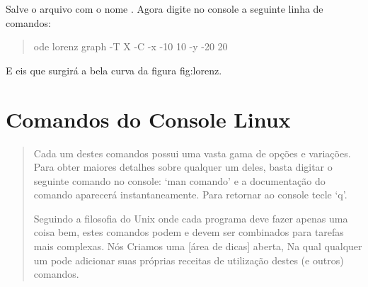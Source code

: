 \documentclass[a4paper,10pt,brazil]{sphinxmanual}
\begin{document}
Salve o arquivo com o nome . Agora digite no console a
seguinte linha de comandos:
\begin{quote}

ode lorenz graph -T X -C -x -10 10 -y -20 20
\end{quote}

E eis que surgirá a bela curva da figura fig:lorenz.


\chapter{Comandos do Console Linux}
\label{unix::doc}\label{unix:comandos-do-console-linux}\begin{quote}

Cada um destes comandos possui uma vasta gama de opções e
variações. Para obter maiores detalhes sobre qualquer um deles,
basta digitar o seguinte comando no console: `man comando' e a
documentação do comando aparecerá instantaneamente. Para retornar
ao console tecle `q'.

Seguindo a filosofia do Unix onde cada programa deve fazer apenas
uma coisa bem, estes comandos podem e devem ser combinados para
tarefas mais complexas. Nós Criamos uma {[}área de dicas{]} aberta, Na
qual qualquer um pode adicionar suas próprias receitas de
utilização destes (e outros) comandos.
\end{quote}
\end{document}
